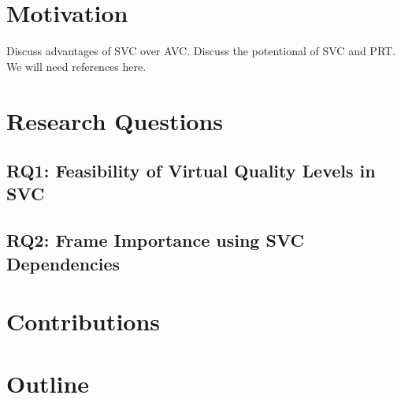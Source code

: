 \section{Motivation}
    Discuss advantages of SVC over AVC.
    Discuss the potentional of SVC and PRT.
    We will need references here.

\section{Research Questions}
    \subsection{RQ1: Feasibility of Virtual Quality Levels in SVC}
    \subsection{RQ2: Frame Importance using SVC Dependencies}

\section{Contributions}

\section{Outline}